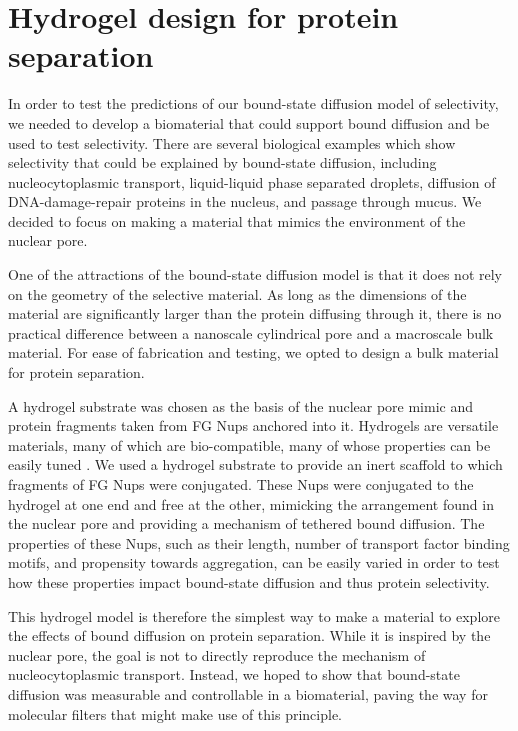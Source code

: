 \chapter{Hydrogel design for protein separation}\label{ch03}

In order to test the predictions of our bound-state diffusion model of selectivity, we needed to develop a biomaterial that could support bound diffusion and be used to test selectivity.  There are several biological examples which show selectivity that could be explained by bound-state diffusion, including nucleocytoplasmic transport, liquid-liquid phase separated droplets, diffusion of DNA-damage-repair proteins in the nucleus, and passage through mucus\cite{witten17,hoiby10, rudolph18,zhou13}.  We decided to focus on making a material that mimics the environment of the nuclear pore.

One of the attractions of the bound-state diffusion model is that it does not rely on the geometry of the selective material.  As long as the dimensions of the material are significantly larger than the protein diffusing through it, there is no practical difference between a nanoscale cylindrical pore and a macroscale bulk material.  For ease of fabrication and testing, we opted to design a bulk material for protein separation.

A hydrogel substrate was chosen as the basis of the nuclear pore mimic and protein fragments taken from FG Nups anchored into it.  Hydrogels are versatile materials, many of which are bio-compatible, many of whose properties can be easily tuned .  We used a hydrogel substrate to provide an inert scaffold to which fragments of FG Nups were conjugated.  These Nups were conjugated to the hydrogel at one end and free at the other, mimicking the arrangement found in the nuclear pore and providing a mechanism of tethered bound diffusion.  The properties of these Nups, such as their length, number of transport factor binding motifs, and propensity towards aggregation, can be easily varied in order to test how these properties impact bound-state diffusion and thus protein selectivity.

This hydrogel model is therefore the simplest way to make a material to explore the effects of bound diffusion on protein separation.  While it is inspired by the nuclear pore, the goal is not to directly reproduce the mechanism of nucleocytoplasmic transport.  Instead, we hoped to show that bound-state diffusion was measurable and controllable in a biomaterial, paving the way for molecular filters that might make use of this principle.

